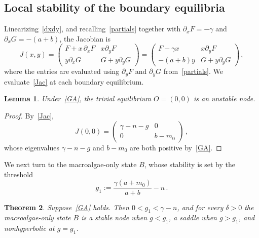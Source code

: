 \documentclass[reqno,11pt]{amsart}
\newtheorem{thm}{Theorem}[section]
\newtheorem{lem}[thm]{Lemma}
\numberwithin{equation}{section}
\begin{document}
\smallskip

\subsection{Local stability of the boundary equilibria}\label{subsec:stab-boundary}

Linearizing~\eqref{dxdy}, and recalling~\eqref{partials} together with $\partial_xF=-\gamma$ and $\partial_xG=-(a+b)$, the Jacobian is
\begin{equation}\label{Jac}
J(x,y)=\begin{pmatrix} F+x\,\partial_xF & x\partial_yF\\[4pt] y\partial_xG & G+y\partial_yG\end{pmatrix}
=\begin{pmatrix} F-\gamma x & x\partial_yF\\[4pt] -(a+b)y & G+y\partial_yG\end{pmatrix}\,,
\end{equation}
where the entries are evaluated using $\partial_yF$ and $\partial_yG$ from~\eqref{partials}. We evaluate~\eqref{Jac} at each boundary equilibrium.

\begin{lem}\label{lem:stabO}
Under~\eqref{GA}, the trivial equilibrium $O=(0,0)$ is an unstable node.
\end{lem}

\begin{proof}
By~\eqref{Jac},
\[
J(0,0)=\begin{pmatrix}\gamma-n-g & 0\\[3pt] 0 & b-m_0\end{pmatrix}\,,
\]
whose eigenvalues $\gamma-n-g$ and $b-m_0$ are both positive by~\eqref{GA}.
\end{proof}

We next turn to the macroalgae-only state $B$, whose stability is set by the threshold
\begin{equation}\label{g1}
g_1:=\frac{\gamma(a+m_0)}{a+b}-n\,.
\end{equation}

\begin{thm}\label{thm:stabB}
Suppose~\eqref{GA} holds. Then $0<g_1<\gamma-n$, and for every $\delta>0$ the macroalgae-only state $B$ is a stable node when $g<g_1$, a saddle when $g>g_1$, and nonhyperbolic at $g=g_1$.
\end{thm}
\end{document}
